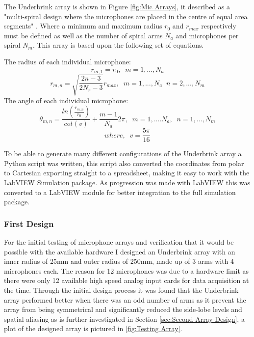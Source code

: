 \documentclass{UoNMCHA}
\numberwithin{equation}{section}
\begin{document}
    The Underbrink array is shown in Figure \ref{fig:Mic Arrays}, it described as a "multi-spiral design where the microphones are placed in the centre of equal area segments" \citep{Pri13}. Where a minimum and maximum radius $r_0$ and $r_{max}$ respectively must be defined as well as the number of spiral arms $N_a$ and microphones per spiral $N_m$. This array is based upon the following set of equations.
    
    The radius of each individual microphone:
    \begin{equation}
        r_{m,1} = r_0,\;\;m=1,...,N_a
    \end{equation}
    \begin{equation*}
        r_{m,n}=\sqrt{\frac{2n-3}{2N_r-3}}r_{max},\;\;m=1,...,N_a\;\;n=2,...,N_m
    \end{equation*}
    The angle of each individual microphone:
    \begin{equation}
        \theta_{m,n} = \frac{ln(\frac{r_{m,n}}{r_0})}{cot(v)} + \frac{m-1}{N_a}2\pi,\;\;m=1,....N_a,\;\;n=1,...,N_m
    \end{equation}
    \begin{equation*}
        where,\;\;v=\frac{5\pi}{16}
    \end{equation*}
    
    To be able to generate many different configurations of the Underbrink array a Python script was written, this script also converted the coordinates from polar to Cartesian exporting straight to a spreadsheet, making it easy to work with the LabVIEW Simulation package. As progression was made with LabVIEW this was converted to a LabVIEW module for better integration to the full simulation package. 
\subsubsection{First Design} \label{sec:First Array Design}
    For the initial testing of microphone arrays and verification that it would be possible with the available hardware I designed an Underbrink array with an inner radius of 25mm and outer radius of 250mm, made up of 3 arms with 4 microphones each. The reason for 12 microphones was due to a hardware limit as there were only 12 available high speed analog input cards for data acquisition at the time. Through the initial design process it was found that the Underbrink array performed better when there was an odd number of arms as it prevent the array from being symmetrical and significantly reduced the side-lobe levels and spatial aliasing as is further investigated in Section \ref{sec:Second Array Design}, a plot of the designed array is pictured in \ref{fig:Testing Array}.
    
\end{document}
